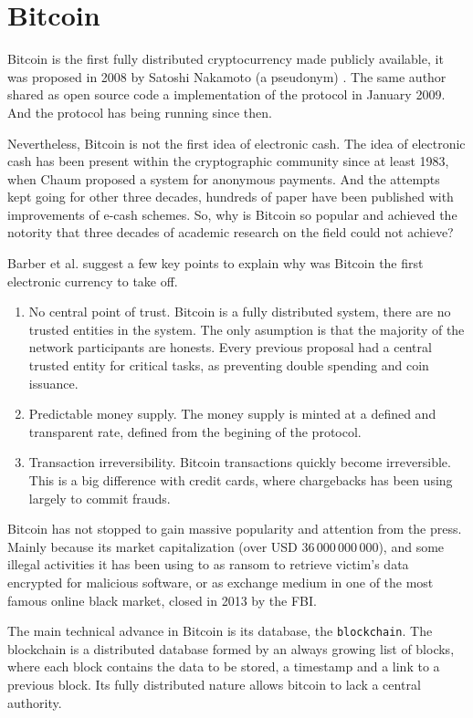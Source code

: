 \section{Bitcoin}
Bitcoin is the first fully distributed cryptocurrency made publicly available,
  it was proposed in 2008 by Satoshi Nakamoto (a pseudonym)
  \cite{nakamoto2008bitcoin}.
The same author shared as open source code a implementation of the protocol in
  January 2009. And the protocol has being running since then.

Nevertheless, Bitcoin is not the first idea of electronic cash.
The idea of electronic cash has been present within the cryptographic community
  since at least 1983, when Chaum \cite{chaum1983blind} proposed a system for
  anonymous payments.
And the attempts kept going for other three decades, hundreds of paper have
  been published with improvements of e-cash schemes\cite{barber2012bitter}.
So, why is Bitcoin so popular and achieved the notority that three decades of
  academic research on the field could not achieve?

Barber et al.\cite{barber2012bitter} suggest a few key points to explain why
  was Bitcoin the first electronic currency to take off.
\begin{enumerate}
\item No central point of trust.
	Bitcoin is a fully distributed system, there are no trusted entities in the
	  system. The only asumption is that the majority of the network participants
	  are honests. Every previous proposal had a central trusted entity for
	  critical tasks, as preventing double spending and coin issuance.
\item Predictable money supply.
	The money supply is minted at a defined and transparent rate, defined from the
	begining of the protocol.
\item Transaction irreversibility.
	Bitcoin transactions quickly become irreversible. This is a big difference with
	  credit cards, where chargebacks has been using largely to commit frauds.
\end{enumerate}
Bitcoin has not stopped to gain massive popularity and attention from the press.
Mainly because its market capitalization (over USD $36\,000\,000\,000$), and some
  illegal activities it has been using to as ransom to retrieve victim's data
  encrypted for malicious software, or as exchange medium in one of the most
  famous online black market, closed in 2013 by the FBI.

  The main technical advance in Bitcoin is its database, the
  \texttt{blockchain}\cite{inventionblockchain}\cite{blockchainmostimportant}.
The blockchain is a distributed database formed by an always growing list of
  blocks, where each block contains the data to be stored, a timestamp and a
  link to a previous block. Its fully distributed nature allows bitcoin to lack
  a central authority.



